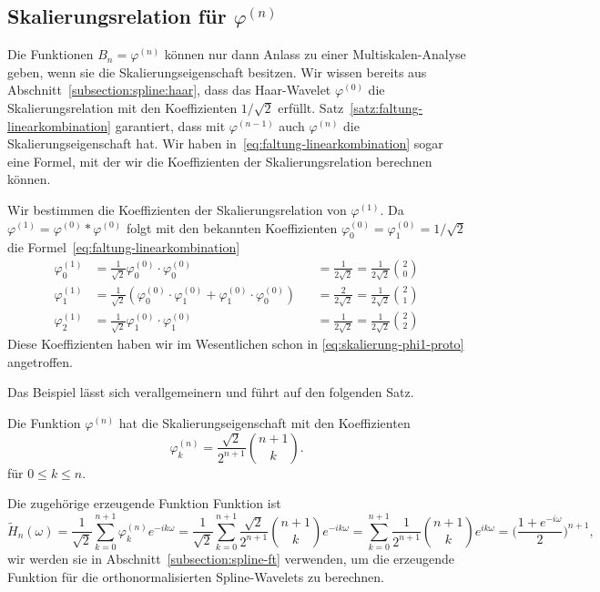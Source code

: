 \subsection{Skalierungsrelation für $\varphi^{(n)}$
\label{subsection:skalierungsrelation-phin}}
Die Funktionen $B_n=\varphi^{(n)}$ können nur dann Anlass zu einer
Multiskalen-Analyse geben, wenn sie die Skalierungseigenschaft
besitzen.
Wir wissen bereits aus Abschnitt~\ref{subsection:spline:haar},
dass das Haar-Wavelet $\varphi^{(0)}$ die Skalierungsrelation
mit den Koeffizienten $1/\sqrt{2}$ erfüllt.
Satz~\ref{satz:faltung-linearkombination} garantiert, dass mit
$\varphi^{(n-1)}$ auch $\varphi^{(n)}$ die Skalierungseigenschaft hat.
Wir haben in~\eqref{eq:faltung-linearkombination}
sogar eine Formel, mit der wir die Koeffizienten der Skalierungsrelation
berechnen können.

\begin{beispiel}
Wir bestimmen die Koeffizienten der Skalierungsrelation von $\varphi^{(1)}$.
Da $\varphi^{(1)}=\varphi^{(0)}*\varphi^{(0)}$ folgt mit den bekannten
Koeffizienten $\varphi^{(0)}_0=\varphi^{(0)}_1=1/\sqrt{2}$ die
Formel~\eqref{eq:faltung-linearkombination}
\[
\begin{aligned}
\varphi^{(1)}_0
&=
\frac1{\sqrt{2}}
\varphi^{(0)}_0
\cdot
\varphi^{(0)}_0
&&=
\frac{1}{2\sqrt{2}}
=\frac{1}{2\sqrt{2}}\binom{2}{0}
\\
\varphi^{(1)}_1
&=
\frac1{\sqrt{2}}
(
\varphi^{(0)}_0
\cdot
\varphi^{(0)}_1
+
\varphi^{(0)}_1
\cdot
\varphi^{(0)}_0
)
&&=
\frac{2}{2\sqrt{2}}
=\frac{1}{2\sqrt{2}}\binom{2}{1}
\\
\varphi^{(1)}_2
&=
\frac1{\sqrt{2}}
\varphi^{(0)}_1
\cdot
\varphi^{(0)}_1
&&=
\frac{1}{2\sqrt{2}}
=\frac{1}{2\sqrt{2}}\binom{2}{2}
\end{aligned}
\]
Diese Koeffizienten haben wir im Wesentlichen schon in
\eqref{eq:skalierung-phi1-proto} angetroffen.
\end{beispiel}

Das Beispiel lässt sich verallgemeinern und führt auf den folgenden Satz.

\begin{satz}
Die Funktion $\varphi^{(n)}$ hat die Skalierungseigenschaft  mit den
Koeffizienten
\[
\varphi^{(n)}_k = \frac{\sqrt{2}}{2^{n+1}}\binom{n+1}{k}.
\]
für $0\le k\le n$.
\end{satz}
Die zugehörige erzeugende Funktion Funktion ist
\begin{equation}
\tilde{H}_n(\omega)
=
\frac{1}{\sqrt{2}}
\sum_{k=0}^{n+1}
\varphi_k^{(n)} e^{-ik\omega}
=
\frac{1}{\sqrt{2}}
\sum_{k=0}^{n+1}
\frac{\sqrt{2}}{2^{n+1}}
\binom{n+1}{k}
e^{-ik\omega}
=
\sum_{k=0}^{n+1}
\frac{1}{2^{n+1}}
\binom{n+1}{k}
e^{ik\omega}
=
\biggl(
\frac{1+e^{-i\omega}}{2}
\biggr)^{n+1},
\end{equation}
wir werden sie in Abschnitt~\ref{subsection:spline-ft} verwenden,
um die erzeugende Funktion für die orthonormalisierten Spline-Wavelets
zu berechnen.


